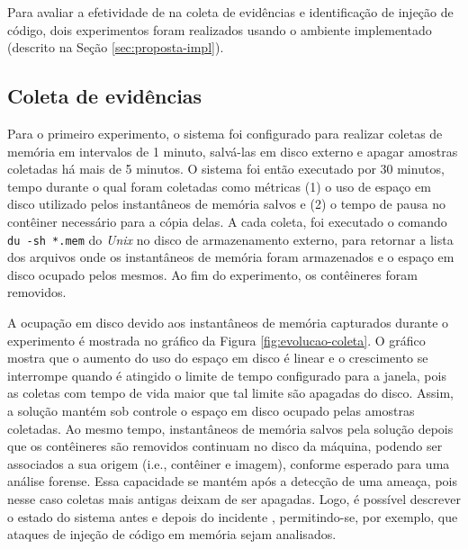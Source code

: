Para avaliar a efetividade de \fancyname na coleta de evidências e identificação de injeção de código, dois experimentos foram realizados usando o ambiente implementado (descrito na Seção \ref{sec:proposta-impl}).
%


\subsection{Coleta de evidências}
\label{sec:proposta-exp-coleta}

Para o primeiro experimento, o sistema foi configurado para realizar coletas de memória em intervalos de 1 minuto, salvá-las em disco externo e apagar amostras coletadas há mais de 5 minutos. 
%
O sistema foi então executado por 30 minutos, tempo durante o qual foram coletadas como métricas (1) o uso de espaço em disco utilizado pelos instantâneos de memória salvos e (2) o tempo de pausa no contêiner necessário para a cópia delas.
%
A cada coleta, foi executado o comando \texttt{du -sh *.mem} do \textit{Unix} no disco de armazenamento externo, para retornar a lista dos arquivos onde os instantâneos de memória foram armazenados e o espaço em disco ocupado pelos mesmos. 
%
Ao fim do experimento, os contêineres foram removidos.


A ocupação em disco devido aos instantâneos de memória capturados durante o experimento é mostrada no gráfico da Figura \ref{fig:evolucao-coleta}. 
%
O gráfico mostra que o aumento do uso do espaço em disco é linear e o crescimento se interrompe quando é atingido o limite de tempo configurado para a janela, pois as coletas com tempo de vida maior que tal limite são apagadas do disco. 
%
Assim, a solução mantém sob controle o espaço em disco ocupado pelas amostras coletadas.
%
Ao mesmo tempo, instantâneos de memória salvos pela solução depois que os contêineres são removidos continuam no disco da máquina, podendo ser associados a sua origem (i.e., contêiner e imagem), conforme esperado para uma análise forense.
%
Essa capacidade se mantém após a detecção de uma ameaça, pois nesse caso coletas mais antigas deixam de ser apagadas.
%
Logo, é possível descrever o estado do sistema antes e depois do incidente \cite{CaseMemoryForensics:2014}, permitindo-se, por exemplo, que ataques de injeção de código em memória sejam analisados.


